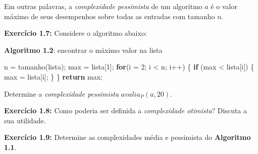 \documentclass{article}
\newenvironment{Shaded}{}{}
\newcommand{\KeywordTok}[1]{\textcolor[rgb]{0.00,0.44,0.13}{\textbf{{#1}}}}
\newcommand{\DecValTok}[1]{\textcolor[rgb]{0.25,0.63,0.44}{{#1}}}
\newcommand{\FunctionTok}[1]{\textcolor[rgb]{0.02,0.16,0.49}{{#1}}}
\newcommand{\NormalTok}[1]{{#1}}
\begin{document}
Em outras palavras, a \emph{complexidade pessimista} de um algoritmo
\(a\) é o valor máximo de seus desempenhos sobre todas as entradas com
tamanho \(n\).

\textbf{Exercício 1.7:} Considere o algoritmo abaixo:

\textbf{Algoritmo 1.2}: encontrar o máximo valor na lista

    \begin{Shaded}
\begin{Highlighting}[]
\NormalTok{n = }\FunctionTok{tamanho}\NormalTok{(lista);}
\NormalTok{max = lista[}\DecValTok{1}\NormalTok{];}
\KeywordTok{for}\NormalTok{(i = }\DecValTok{2}\NormalTok{; i < n; i++) \{}
    \KeywordTok{if} \NormalTok{(max < lista[i]) \{}
        \NormalTok{max = lista[i];}
    \NormalTok{\}}
\NormalTok{\}}
\KeywordTok{return} \NormalTok{max;}
\end{Highlighting}
\end{Shaded}

    Determine a \emph{complexidade pessimista} \(avalia_P(a, 20)\).

\textbf{Exercício 1.8:} Como poderia ser definida a \emph{complexidade
otimista}? Discuta a sua utilidade.

\textbf{Exercício 1.9:} Determine as complexidades média e pessimista do
\textbf{Algoritmo 1.1}.


    
    
    
    
\end{document}
